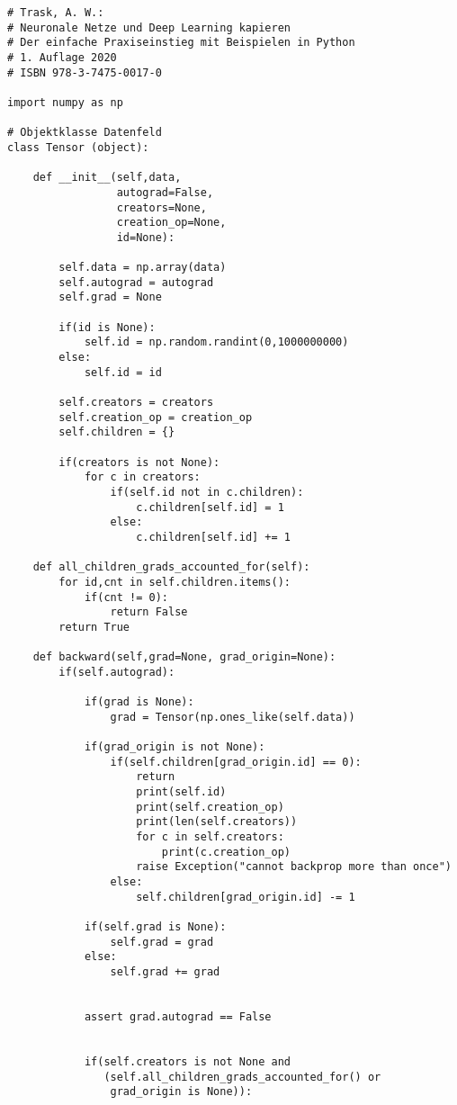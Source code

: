 \documentclass[12pt]{article}
\begin{document}
\begin{verbatim}
# Trask, A. W.:
# Neuronale Netze und Deep Learning kapieren
# Der einfache Praxiseinstieg mit Beispielen in Python
# 1. Auflage 2020
# ISBN 978-3-7475-0017-0

import numpy as np

# Objektklasse Datenfeld
class Tensor (object):
    
    def __init__(self,data,
                 autograd=False,
                 creators=None,
                 creation_op=None,
                 id=None):
        
        self.data = np.array(data)
        self.autograd = autograd
        self.grad = None

        if(id is None):
            self.id = np.random.randint(0,1000000000)
        else:
            self.id = id
        
        self.creators = creators
        self.creation_op = creation_op
        self.children = {}
        
        if(creators is not None):
            for c in creators:
                if(self.id not in c.children):
                    c.children[self.id] = 1
                else:
                    c.children[self.id] += 1

    def all_children_grads_accounted_for(self):
        for id,cnt in self.children.items():
            if(cnt != 0):
                return False
        return True 
        
    def backward(self,grad=None, grad_origin=None):
        if(self.autograd):
 
            if(grad is None):
                grad = Tensor(np.ones_like(self.data))

            if(grad_origin is not None):
                if(self.children[grad_origin.id] == 0):
                    return
                    print(self.id)
                    print(self.creation_op)
                    print(len(self.creators))
                    for c in self.creators:
                        print(c.creation_op)
                    raise Exception("cannot backprop more than once")
                else:
                    self.children[grad_origin.id] -= 1

            if(self.grad is None):
                self.grad = grad
            else:
                self.grad += grad
            

            assert grad.autograd == False
            

            if(self.creators is not None and 
               (self.all_children_grads_accounted_for() or 
                grad_origin is None)):


\end{verbatim}
\end{document}
